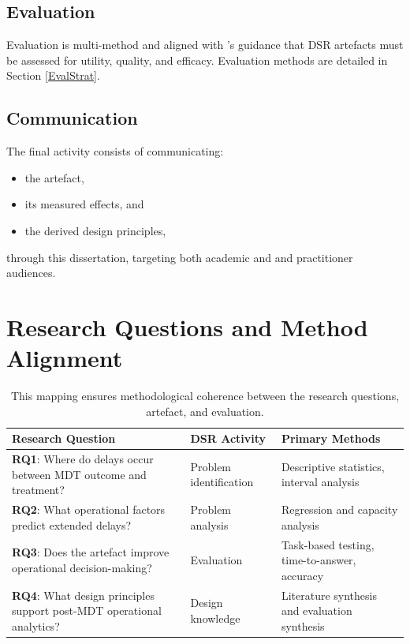 \subsection{Evaluation}
Evaluation is multi-method and aligned with \cite{hevner2004}'s guidance that DSR artefacts must be assessed for utility, quality, and efficacy. Evaluation methods are detailed in Section \ref{EvalStrat}.

\subsection{Communication}
The final activity consists of communicating:
\begin{itemize}
    \item the artefact,
    \item its measured effects, and
    \item the derived design principles,
\end{itemize}
through this dissertation, targeting both academic and and practitioner audiences. 

\section{Research Questions and Method Alignment}

\begin{table}[h]
    \centering
    \begin{tabular}{|p{5cm}|p{3cm}|p{5cm}|}
        \hline
        \textbf{Research Question} & \textbf{DSR Activity} & \textbf{Primary Methods} \\
        \hline\hline
        \textbf{RQ1}: Where do delays occur between MDT outcome and treatment? & Problem identification & Descriptive statistics, interval analysis \\
        \hline
        \textbf{RQ2}: What operational factors predict extended delays? & Problem analysis & Regression and capacity analysis\\
        \hline
        \textbf{RQ3}: Does the artefact improve operational decision-making? & Evaluation & Task-based testing, time-to-answer, accuracy\\
        \hline
        \textbf{RQ4}: What design principles support post-MDT operational analytics? & Design knowledge & Literature synthesis and evaluation synthesis\\
        \hline
    \end{tabular}
    \caption{This mapping ensures methodological coherence between the research questions, artefact, and evaluation.}
    \label{tab:rq-dsr-mapping}
\end{table}

